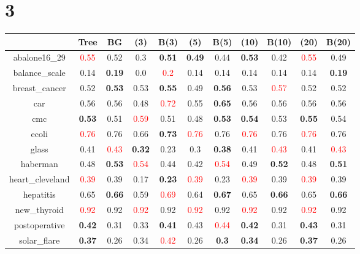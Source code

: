 \documentclass{article}%
\begin{document}
\section*{3}%
\begin{tabular}{c|cccccccccc}%
\hline%
&Tree&BG&(3)&B(3)&(5)&B(5)&(10)&B(10)&(20)&B(20)\\%
\hline%
abalone16\_29&\textcolor{red}{ 
0.55
}&0.52&0.3&\textbf{0.51}&\textbf{0.49}&0.44&\textbf{0.53}&0.42&\textcolor{red}{ 
0.55
}&0.49\\%
\hline%
balance\_scale&0.14&\textbf{0.19}&0.0&\textcolor{red}{ 
0.2
}&0.14&0.14&0.14&0.14&0.14&\textbf{0.19}\\%
\hline%
breast\_cancer&0.52&\textbf{0.53}&0.53&\textbf{0.55}&0.49&\textbf{0.56}&0.53&\textcolor{red}{ 
0.57
}&0.52&0.52\\%
\hline%
car&0.56&0.56&0.48&\textcolor{red}{ 
0.72
}&0.55&\textbf{0.65}&0.56&0.56&0.56&0.56\\%
\hline%
cmc&\textbf{0.53}&0.51&\textcolor{red}{ 
0.59
}&0.51&0.48&\textbf{0.53}&\textbf{0.54}&0.53&\textbf{0.55}&0.54\\%
\hline%
ecoli&\textcolor{red}{ 
0.76
}&0.76&0.66&\textbf{0.73}&\textcolor{red}{ 
0.76
}&0.76&\textcolor{red}{ 
0.76
}&0.76&\textcolor{red}{ 
0.76
}&0.76\\%
\hline%
glass&0.41&\textcolor{red}{ 
0.43
}&\textbf{0.32}&0.23&0.3&\textbf{0.38}&0.41&\textcolor{red}{ 
0.43
}&0.41&\textcolor{red}{ 
0.43
}\\%
\hline%
haberman&0.48&\textbf{0.53}&\textcolor{red}{ 
0.54
}&0.44&0.42&\textcolor{red}{ 
0.54
}&0.49&\textbf{0.52}&0.48&\textbf{0.51}\\%
\hline%
heart\_cleveland&\textcolor{red}{ 
0.39
}&0.39&0.17&\textbf{0.23}&\textcolor{red}{ 
0.39
}&0.23&\textcolor{red}{ 
0.39
}&0.39&\textcolor{red}{ 
0.39
}&0.39\\%
\hline%
hepatitis&0.65&\textbf{0.66}&0.59&\textcolor{red}{ 
0.69
}&0.64&\textbf{0.67}&0.65&\textbf{0.66}&0.65&\textbf{0.66}\\%
\hline%
new\_thyroid&\textcolor{red}{ 
0.92
}&0.92&\textcolor{red}{ 
0.92
}&0.92&\textcolor{red}{ 
0.92
}&0.92&\textcolor{red}{ 
0.92
}&0.92&\textcolor{red}{ 
0.92
}&0.92\\%
\hline%
postoperative&\textbf{0.42}&0.31&0.33&\textbf{0.41}&0.43&\textcolor{red}{ 
0.44
}&\textbf{0.42}&0.31&\textbf{0.43}&0.31\\%
\hline%
solar\_flare&\textbf{0.37}&0.26&0.34&\textcolor{red}{ 
0.42
}&0.26&\textbf{0.3}&\textbf{0.34}&0.26&\textbf{0.37}&0.26\\%

\end{tabular}
\end{document}
